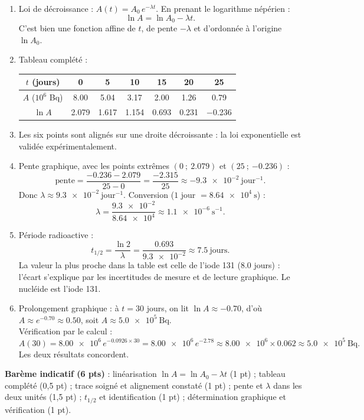 \documentclass[11pt]{article}
\newcommand{\cle}[1]{{\popxbold\color{popdark}#1}}
\begin{document}
\begin{corrige}
\begin{enumerate}
\item Loi de décroissance : $A(t) = A_0\,e^{-\lambda t}$. En prenant le logarithme népérien :
\[ \ln A = \ln A_0 - \lambda t. \]
C'est bien une fonction \cle{affine} de $t$, de pente $-\lambda$ et d'ordonnée à l'origine $\ln A_0$.
\item Tableau complété :

\begin{center}
\begin{tabular}{|c|cccccc|}
\hline
$t$ (jours) & 0 & 5 & 10 & 15 & 20 & 25 \\
\hline
$A$ ($10^{6}$ Bq) & \num{8,00} & \num{5,04} & \num{3,17} & \num{2,00} & \num{1,26} & \num{0,79} \\
\hline
$\ln A$ & \num{2,079} & \num{1,617} & \num{1,154} & \num{0,693} & \num{0,231} & \num{-0,236} \\
\hline
\end{tabular}
\end{center}

\item Les six points sont alignés sur une droite décroissante : la loi exponentielle est validée expérimentalement.
\item Pente graphique, avec les points extrêmes $(0\ ;\ \num{2,079})$ et $(25\ ;\ \num{-0,236})$ :
\[ \text{pente} = \frac{\num{-0,236} - \num{2,079}}{25 - 0} = \frac{\num{-2,315}}{25} \approx \num{-9,3e-2}\ \mathrm{jour^{-1}}. \]
Donc $\lambda \approx \num{9,3e-2}\ \mathrm{jour^{-1}}$. Conversion ($1$ jour $= \num{8,64e4}\ \mathrm{s}$) :
\[ \lambda = \frac{\num{9,3e-2}}{\num{8,64e4}} \approx \num{1,1e-6}\ \mathrm{s^{-1}}. \]
\item Période radioactive :
\[ t_{1/2} = \frac{\ln 2}{\lambda} = \frac{\num{0,693}}{\num{9,3e-2}} \approx \num{7,5}\ \mathrm{jours}. \]
La valeur la plus proche dans la table est celle de l'\cle{iode 131} ($\num{8,0}$ jours) : l'écart s'explique par les incertitudes de mesure et de lecture graphique. Le nucléide est l'iode 131.
\item Prolongement graphique : à $t = \num{30}$ jours, on lit $\ln A \approx \num{-0,70}$, d'où $A \approx e^{-\num{0,70}} \approx \num{0,50}$, soit $A \approx \num{5,0e5}\ \mathrm{Bq}$. \\
Vérification par le calcul :
\[ A(30) = \num{8,00e6}\,e^{-\num{0,0926} \times 30} = \num{8,00e6}\,e^{-\num{2,78}} \approx \num{8,00e6} \times \num{0,062} \approx \num{5,0e5}\ \mathrm{Bq}. \]
Les deux résultats concordent.
\end{enumerate}
\textbf{Barème indicatif (6 pts)} : linéarisation $\ln A = \ln A_0 - \lambda t$ (1 pt) ; tableau complété (0,5 pt) ; trace soigné et alignement constaté (1 pt) ; pente et $\lambda$ dans les deux unités (1,5 pt) ; $t_{1/2}$ et identification (1 pt) ; détermination graphique et vérification (1 pt).
\end{corrige}
\end{document}
